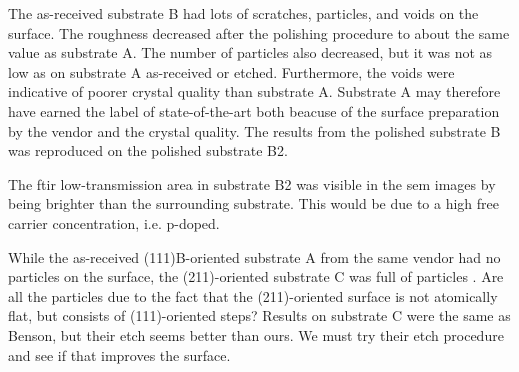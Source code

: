 

The as-received substrate B had lots of scratches, particles, and voids on the surface. The roughness decreased after the polishing procedure to about the same value as substrate A. The number of particles also decreased, but it was not as low as on substrate A as-received or etched. Furthermore, the voids were indicative of poorer crystal quality than substrate A. Substrate A may therefore have earned the label of state-of-the-art both beacuse of the surface preparation by the vendor and the crystal quality. The results from the polished substrate B was reproduced on the polished substrate B2.

The \ac{ftir} low-transmission area in substrate B2 was visible in the \ac{sem} images by being brighter than the surrounding substrate. This would be due to a high free carrier concentration, i.e. p-doped.

While the as-received (111)B-oriented substrate A from the same vendor had no particles on the surface, the (211)-oriented substrate C was full of particles . Are all the particles due to the fact that the (211)-oriented surface is not atomically flat, but consists of (111)-oriented steps?  Results on substrate C were the same as Benson, but their etch seems better than ours. We must try their etch procedure and see if that improves the surface.

